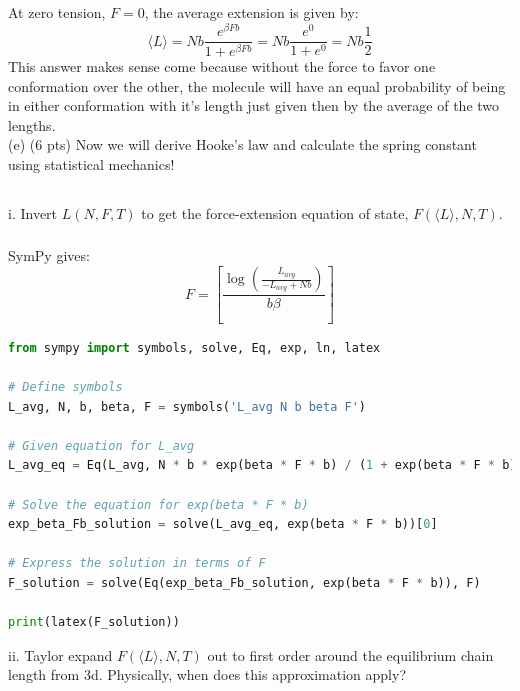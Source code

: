 \documentclass[12pt]{article}
\begin{document}
\subsection{}
At zero tension, $F=0$, the average extension is given by:
\begin{equation}
  \langle L \rangle = N b \frac{e^{\beta F b}}{1+e^{\beta F b}} = N b \frac{e^{0}}{1+e^{0}} = N b \frac{1}{2}
\end{equation}
This answer makes sense come because without the force to favor one conformation over the other, the molecule will have an equal probability of being in either conformation with it's length just given then by the average of the two lengths.\\

(e) (6 pts) Now we will derive Hooke's law and calculate the spring constant using statistical mechanics!
\subsection{}

i. Invert $L(N, F, T)$ to get the force-extension equation of state, $F(\langle L\rangle, N, T)$.
\subsubsection{}
SymPy gives:
\begin{equation}
  F = \left[ \frac{\log{\left(\frac{L_{avg}}{- L_{avg} + N b} \right)}}{b \beta}\right]
\end{equation}
\begin{lstlisting}[language=Python]
from sympy import symbols, solve, Eq, exp, ln, latex

# Define symbols
L_avg, N, b, beta, F = symbols('L_avg N b beta F')

# Given equation for L_avg
L_avg_eq = Eq(L_avg, N * b * exp(beta * F * b) / (1 + exp(beta * F * b)))

# Solve the equation for exp(beta * F * b)
exp_beta_Fb_solution = solve(L_avg_eq, exp(beta * F * b))[0]

# Express the solution in terms of F
F_solution = solve(Eq(exp_beta_Fb_solution, exp(beta * F * b)), F)

print(latex(F_solution))

\end{lstlisting}

ii. Taylor expand $F(\langle L\rangle, N, T)$ out to first order around the equilibrium chain length from 3d. Physically, when does this approximation apply?
\end{document}
